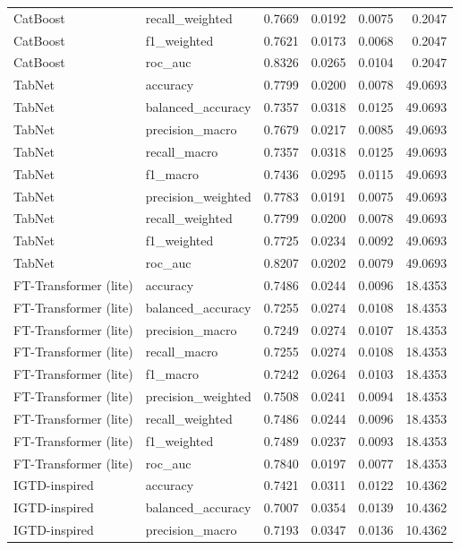 \begin{tabular}{llrrrr}
CatBoost & recall_weighted & 0.7669 & 0.0192 & 0.0075 & 0.2047 \\
CatBoost & f1_weighted & 0.7621 & 0.0173 & 0.0068 & 0.2047 \\
CatBoost & roc_auc & 0.8326 & 0.0265 & 0.0104 & 0.2047 \\
TabNet & accuracy & 0.7799 & 0.0200 & 0.0078 & 49.0693 \\
TabNet & balanced_accuracy & 0.7357 & 0.0318 & 0.0125 & 49.0693 \\
TabNet & precision_macro & 0.7679 & 0.0217 & 0.0085 & 49.0693 \\
TabNet & recall_macro & 0.7357 & 0.0318 & 0.0125 & 49.0693 \\
TabNet & f1_macro & 0.7436 & 0.0295 & 0.0115 & 49.0693 \\
TabNet & precision_weighted & 0.7783 & 0.0191 & 0.0075 & 49.0693 \\
TabNet & recall_weighted & 0.7799 & 0.0200 & 0.0078 & 49.0693 \\
TabNet & f1_weighted & 0.7725 & 0.0234 & 0.0092 & 49.0693 \\
TabNet & roc_auc & 0.8207 & 0.0202 & 0.0079 & 49.0693 \\
FT-Transformer (lite) & accuracy & 0.7486 & 0.0244 & 0.0096 & 18.4353 \\
FT-Transformer (lite) & balanced_accuracy & 0.7255 & 0.0274 & 0.0108 & 18.4353 \\
FT-Transformer (lite) & precision_macro & 0.7249 & 0.0274 & 0.0107 & 18.4353 \\
FT-Transformer (lite) & recall_macro & 0.7255 & 0.0274 & 0.0108 & 18.4353 \\
FT-Transformer (lite) & f1_macro & 0.7242 & 0.0264 & 0.0103 & 18.4353 \\
FT-Transformer (lite) & precision_weighted & 0.7508 & 0.0241 & 0.0094 & 18.4353 \\
FT-Transformer (lite) & recall_weighted & 0.7486 & 0.0244 & 0.0096 & 18.4353 \\
FT-Transformer (lite) & f1_weighted & 0.7489 & 0.0237 & 0.0093 & 18.4353 \\
FT-Transformer (lite) & roc_auc & 0.7840 & 0.0197 & 0.0077 & 18.4353 \\
IGTD-inspired & accuracy & 0.7421 & 0.0311 & 0.0122 & 10.4362 \\
IGTD-inspired & balanced_accuracy & 0.7007 & 0.0354 & 0.0139 & 10.4362 \\
IGTD-inspired & precision_macro & 0.7193 & 0.0347 & 0.0136 & 10.4362 \\

\end{tabular}
